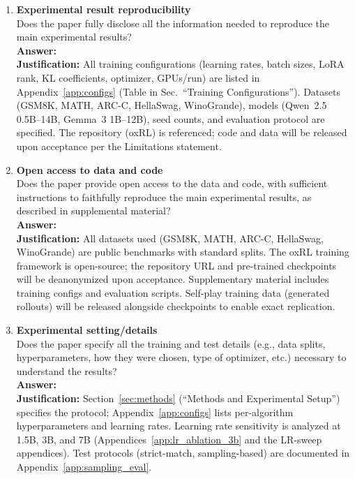 \documentclass{article}
\begin{document}
\begin{enumerate}
\item {\bf Experimental result reproducibility}\\
Does the paper fully disclose all the information needed to reproduce the main experimental results?\\
\textbf{Answer:} \answerYes{}\\
\textbf{Justification:} All training configurations (learning rates, batch sizes, LoRA rank, KL coefficients, optimizer, GPUs/run) are listed in Appendix~\ref{app:configs} (Table in Sec.~``Training Configurations''). Datasets (GSM8K, MATH, ARC-C, HellaSwag, WinoGrande), models (Qwen~2.5 0.5B--14B, Gemma~3 1B--12B), seed counts, and evaluation protocol are specified. The repository (oxRL) is referenced; code and data will be released upon acceptance per the Limitations statement.

\item {\bf Open access to data and code}\\
Does the paper provide open access to the data and code, with sufficient instructions to faithfully reproduce the main experimental results, as described in supplemental material?\\
\textbf{Answer:} \answerYes{}\\
\textbf{Justification:} All datasets used (GSM8K, MATH, ARC-C, HellaSwag, WinoGrande) are public benchmarks with standard splits. The oxRL training framework is open-source; the repository URL and pre-trained checkpoints will be deanonymized upon acceptance. Supplementary material includes training configs and evaluation scripts. Self-play training data (generated rollouts) will be released alongside checkpoints to enable exact replication.

\item {\bf Experimental setting/details}\\
Does the paper specify all the training and test details (e.g., data splits, hyperparameters, how they were chosen, type of optimizer, etc.) necessary to understand the results?\\
\textbf{Answer:} \answerYes{}\\
\textbf{Justification:} Section~\ref{sec:methods} (``Methods and Experimental Setup'') specifies the protocol; Appendix~\ref{app:configs} lists per-algorithm hyperparameters and learning rates. Learning rate sensitivity is analyzed at 1.5B, 3B, and 7B (Appendices~\ref{app:lr_ablation_3b} and the LR-sweep appendices). Test protocols (strict-match, sampling-based) are documented in Appendix~\ref{app:sampling_eval}.


\end{enumerate}
\end{document}
